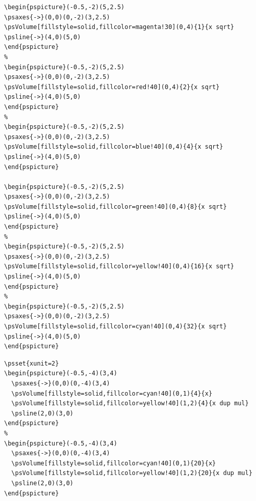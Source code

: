 \documentclass[fontsize=11pt,english,BCOR=10mm,DIV=12,bibliography=totoc,parskip=false,headings=small,
    headinclude=false,footinclude=false,oneside]{pst-doc}
\begin{document}
\begin{lstlisting} 
\begin{pspicture}(-0.5,-2)(5,2.5)
\psaxes{->}(0,0)(0,-2)(3,2.5)
\psVolume[fillstyle=solid,fillcolor=magenta!30](0,4){1}{x sqrt}
\psline{->}(4,0)(5,0)
\end{pspicture}
%
\begin{pspicture}(-0.5,-2)(5,2.5)
\psaxes{->}(0,0)(0,-2)(3,2.5)
\psVolume[fillstyle=solid,fillcolor=red!40](0,4){2}{x sqrt}
\psline{->}(4,0)(5,0)
\end{pspicture}
%
\begin{pspicture}(-0.5,-2)(5,2.5)
\psaxes{->}(0,0)(0,-2)(3,2.5)
\psVolume[fillstyle=solid,fillcolor=blue!40](0,4){4}{x sqrt}
\psline{->}(4,0)(5,0)
\end{pspicture}

\begin{pspicture}(-0.5,-2)(5,2.5)
\psaxes{->}(0,0)(0,-2)(3,2.5)
\psVolume[fillstyle=solid,fillcolor=green!40](0,4){8}{x sqrt}
\psline{->}(4,0)(5,0)
\end{pspicture}
%
\begin{pspicture}(-0.5,-2)(5,2.5)
\psaxes{->}(0,0)(0,-2)(3,2.5)
\psVolume[fillstyle=solid,fillcolor=yellow!40](0,4){16}{x sqrt}
\psline{->}(4,0)(5,0)
\end{pspicture}
%
\begin{pspicture}(-0.5,-2)(5,2.5)
\psaxes{->}(0,0)(0,-2)(3,2.5)
\psVolume[fillstyle=solid,fillcolor=cyan!40](0,4){32}{x sqrt}
\psline{->}(4,0)(5,0)
\end{pspicture}
\end{lstlisting} 

\begin{lstlisting} 
\psset{xunit=2}
\begin{pspicture}(-0.5,-4)(3,4)
  \psaxes{->}(0,0)(0,-4)(3,4)
  \psVolume[fillstyle=solid,fillcolor=cyan!40](0,1){4}{x}
  \psVolume[fillstyle=solid,fillcolor=yellow!40](1,2){4}{x dup mul}
  \psline(2,0)(3,0)
\end{pspicture}
%
\begin{pspicture}(-0.5,-4)(3,4)
  \psaxes{->}(0,0)(0,-4)(3,4)
  \psVolume[fillstyle=solid,fillcolor=cyan!40](0,1){20}{x}
  \psVolume[fillstyle=solid,fillcolor=yellow!40](1,2){20}{x dup mul}
  \psline(2,0)(3,0)
\end{pspicture}
\end{lstlisting} 
\end{document}
